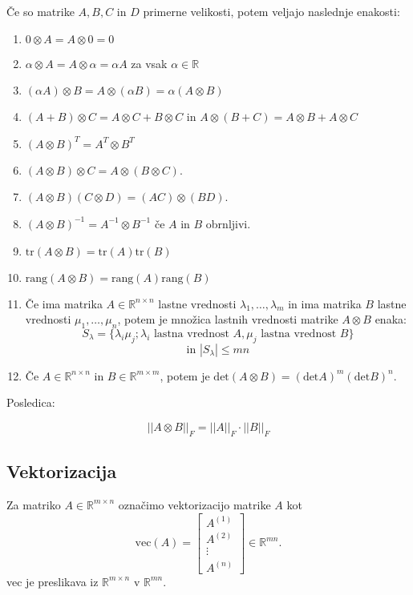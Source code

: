 \documentclass{article}
\begin{document}
\begin{multicols}{2}
Če so matrike $A, B, C$ in $D$ primerne velikosti, potem veljajo naslednje enakosti:
\begin{enumerate}
\item $0 \otimes A = A \otimes 0 = 0$
\item $\alpha \otimes A = A \otimes \alpha = \alpha A$ za vsak $\alpha \in \mathbb{R}$
\item $(\alpha A) \otimes B = A \otimes (\alpha B) = \alpha (A \otimes B)$
\item $(A + B) \otimes C = A \otimes C + B \otimes C$ in $A \otimes (B + C) = A \otimes B + A \otimes C$
\item $(A \otimes B)^T = A^T \otimes B^T$
\item $(A \otimes B) \otimes C = A \otimes (B \otimes C)$.
\item $(A \otimes B)(C \otimes D) = (AC) \otimes (BD)$.
\item $(A \otimes B)^{-1} = A^{-1} \otimes B^{-1}$ če $A$ in $B$ obrnljivi.
\item $\text{tr}(A \otimes B) = \text{tr}(A) \text{tr}(B)$
\item $\text{rang}(A \otimes B) = \text{rang}(A) \text{rang}(B)$
\item Če ima matrika $A \in \mathbb{R}^{n \times n}$ lastne vrednosti $\lambda_1, \ldots, \lambda_m$ in ima matrika $B$ lastne vrednosti $\mu_1, \ldots, \mu_n$, potem je množica lastnih vrednosti matrike $A \otimes B$ enaka:
$$ S_\lambda  = \{ \lambda_i \mu_j; \lambda_i \text{ lastna vrednost } A, \mu_j \text{ lastna vrednost } B\} $$
$$\text{in } |S_\lambda| \leq mn$$
\item Če $A \in \mathbb{R}^{n \times n}$ in $B \in \mathbb{R}^{m \times m}$, potem je $\text{det}(A \otimes B) = (\text{det} A)^m(\text{det} B)^n.$
\end{enumerate}

Posledica:

\[
||A \otimes B||_F = ||A||_F \cdot ||B||_F
\]

\subsection{Vektorizacija}

Za matriko \( A \in \mathbb{R}^{m \times n} \) označimo vektorizacijo matrike \( A \) kot
\[
\text{vec}(A) = \begin{bmatrix}
A^{(1)} \\
A^{(2)} \\
\vdots \\
A^{(n)}
\end{bmatrix} \in \mathbb{R}^{mn}.
\]
vec je preslikava iz \( \mathbb{R}^{m \times n} \) v \( \mathbb{R}^{mn} \).


\end{multicols}
\end{document}
